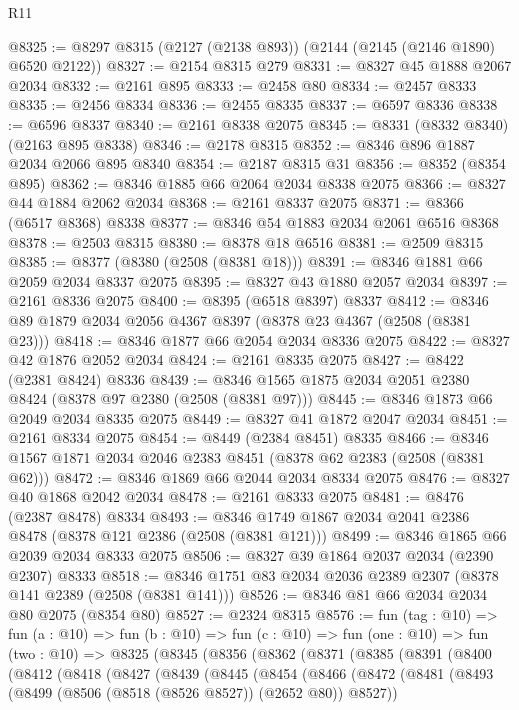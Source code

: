 \begin{lexlean}{R11}
\begin{coremodule}
@8325 := @8297 @8315 (@2127 (@2138 @893)) (@2144 (@2145 (@2146 @1890) @6520 @2122))
@8327 := @2154 @8315 @279
@8331 := @8327 @45 @1888 @2067 @2034
@8332 := @2161 @895
@8333 := @2458 @80
@8334 := @2457 @8333
@8335 := @2456 @8334
@8336 := @2455 @8335
@8337 := @6597 @8336
@8338 := @6596 @8337
@8340 := @2161 @8338 @2075
@8345 := @8331 (@8332 @8340) (@2163 @895 @8338)
@8346 := @2178 @8315
@8352 := @8346 @896 @1887 @2034 @2066 @895 @8340
@8354 := @2187 @8315 @31
@8356 := @8352 (@8354 @895)
@8362 := @8346 @1885 @66 @2064 @2034 @8338 @2075
@8366 := @8327 @44 @1884 @2062 @2034
@8368 := @2161 @8337 @2075
@8371 := @8366 (@6517 @8368) @8338
@8377 := @8346 @54 @1883 @2034 @2061 @6516 @8368
@8378 := @2503 @8315
@8380 := @8378 @18 @6516
@8381 := @2509 @8315
@8385 := @8377 (@8380 (@2508 (@8381 @18)))
@8391 := @8346 @1881 @66 @2059 @2034 @8337 @2075
@8395 := @8327 @43 @1880 @2057 @2034
@8397 := @2161 @8336 @2075
@8400 := @8395 (@6518 @8397) @8337
@8412 := @8346 @89 @1879 @2034 @2056 @4367 @8397 (@8378 @23 @4367 (@2508 (@8381 @23)))
@8418 := @8346 @1877 @66 @2054 @2034 @8336 @2075
@8422 := @8327 @42 @1876 @2052 @2034
@8424 := @2161 @8335 @2075
@8427 := @8422 (@2381 @8424) @8336
@8439 := @8346 @1565 @1875 @2034 @2051 @2380 @8424 (@8378 @97 @2380 (@2508 (@8381 @97)))
@8445 := @8346 @1873 @66 @2049 @2034 @8335 @2075
@8449 := @8327 @41 @1872 @2047 @2034
@8451 := @2161 @8334 @2075
@8454 := @8449 (@2384 @8451) @8335
@8466 := @8346 @1567 @1871 @2034 @2046 @2383 @8451 (@8378 @62 @2383 (@2508 (@8381 @62)))
@8472 := @8346 @1869 @66 @2044 @2034 @8334 @2075
@8476 := @8327 @40 @1868 @2042 @2034
@8478 := @2161 @8333 @2075
@8481 := @8476 (@2387 @8478) @8334
@8493 := @8346 @1749 @1867 @2034 @2041 @2386 @8478 (@8378 @121 @2386 (@2508 (@8381 @121)))
@8499 := @8346 @1865 @66 @2039 @2034 @8333 @2075
@8506 := @8327 @39 @1864 @2037 @2034 (@2390 @2307) @8333
@8518 := @8346 @1751 @83 @2034 @2036 @2389 @2307 (@8378 @141 @2389 (@2508 (@8381 @141)))
@8526 := @8346 @81 @66 @2034 @2034 @80 @2075 (@8354 @80)
@8527 := @2324 @8315
@8576 := fun (tag : @10) =>
  fun (a : @10) =>
  fun (b : @10) =>
  fun (c : @10) =>
  fun (one : @10) =>
  fun (two : @10) =>
  @8325
    (@8345
      (@8356
        (@8362
          (@8371
            (@8385
              (@8391
                (@8400
                  (@8412
                    (@8418
                      (@8427
                        (@8439
                          (@8445
                            (@8454
                              (@8466
                                (@8472
                                  (@8481
                                    (@8493 (@8499 (@8506 (@8518 (@8526 @8527)) (@2652 @80)) @8527))

\end{coremodule}
\end{lexlean}
